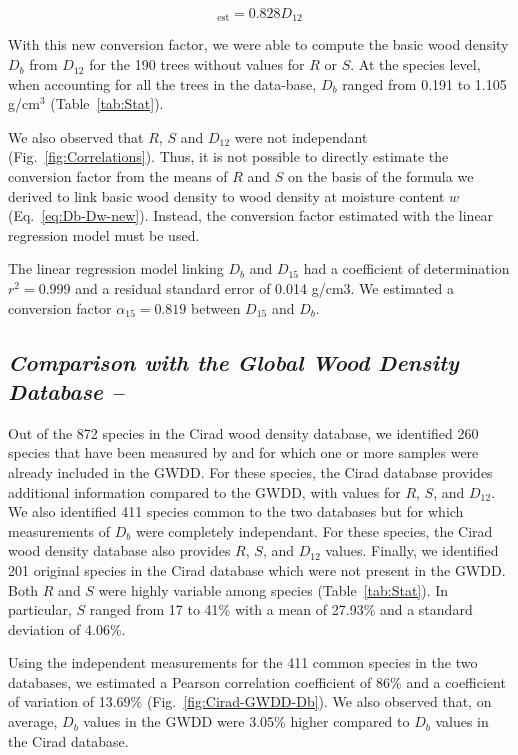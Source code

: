 \documentclass[a4paper, 12pt, leqno, dvipsnames]{article}\usepackage[]{graphicx}\usepackage[]{color}
\begin{document}
\begin{equation}
  [D_b]_{\text{est}}=0.828 D_{12} 
  \label{eq:Db-D12}
\end{equation}

With this new conversion factor, we were able to compute the basic wood density $D_b$ from $D_{12}$ for the 190 trees without values for $R$ or $S$. At the species level, when accounting for all the trees in the data-base, $D_b$ ranged from 0.191 to 1.105 g/cm$^3$ (Table~\ref{tab:Stat}).

We also observed that $R$, $S$ and $D_{12}$ were not independant (Fig.~\ref{fig:Correlations}). Thus, it is not possible to directly estimate the conversion factor from the means of $R$ and $S$ on the basis of the formula we derived to link basic wood density to wood density at moisture content $w$ (Eq.~\ref{eq:Db-Dw-new}). Instead, the conversion factor estimated with the linear regression model must be used.

The linear regression model linking $D_b$ and $D_{15}$ had a coefficient of determination $r^2=0.999$ and a residual standard error of 0.014 g/cm$3$. We estimated a conversion factor $\alpha_{15}=0.819$ between $D_{15}$ and $D_b$.

\subsection*{\textit{Comparison with the Global Wood Density Database --}}

Out of the 872 species in the Cirad wood density database, we identified 260 species that have been measured by \citet{Sallenave1955,Sallenave1964,Sallenave1971} and for which one or more samples were already included in the GWDD. For these species, the Cirad database provides additional information compared to the GWDD, with values for $R$, $S$, and $D_{12}$. We also identified 411 species common to the two databases but for which measurements of $D_b$ were completely independant. For these species, the Cirad wood density database also provides $R$, $S$, and $D_{12}$ values. Finally, we identified 201 original species in the Cirad database which were not present in the GWDD. Both $R$ and $S$ were highly variable among species (Table~\ref{tab:Stat}). In particular, $S$ ranged from 17 to 41\% with a mean of 27.93\% and a standard deviation of 4.06\%.

Using the independent measurements for the 411 common species in the two databases, we estimated a Pearson correlation coefficient of 86\% and a coefficient of variation of 13.69\% (Fig.~\ref{fig:Cirad-GWDD-Db}). We also observed that, on average, $D_b$ values in the GWDD were 3.05\% higher compared to $D_b$ values in the Cirad database.
\end{document}
